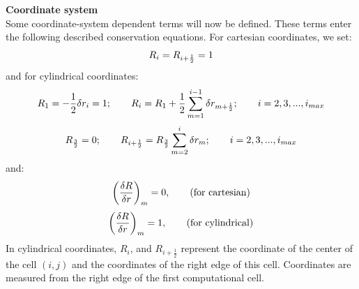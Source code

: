 %
{\bf Coordinate system}\\
Some coordinate-system dependent terms will now be defined.
These terms enter the following described conservation equations.
For cartesian coordinates, we set:
%
\begin{eqnarray}
\htmlimage{}
R_{i} =  R_{i+\frac{1}{2}} = 1
\nonumber
\end{eqnarray}
%
and for cylindrical coordinates:
%
\begin{eqnarray}
\htmlimage{}
R_{1} =  -\frac{1}{2} \delta r_{i} = 1;
\qquad R_{i} =  R_{1}+\frac{1}{2} \sum_{m=1}^{i-1}
\delta r_{m+\frac{1}{2}};\qquad i=2,3,...,i_{max}
\nonumber
\end{eqnarray}
%
\begin{eqnarray}
\htmlimage{}
R_{\frac{3}{2}} =  0; \qquad R_{i+\frac{1}{2}} =  R_{\frac{3}{2}} \sum_{m=2}^{i}
\delta r_{m}; \qquad i = 2,3,...,i_{max}
\nonumber
\end{eqnarray}
%
and:
%
\begin{eqnarray}
\htmlimage{}
\bigg(\frac{\delta R}{\delta r}\bigg)_m  =  0, \qquad \mbox{\rm (for cartesian)}
\nonumber
\end{eqnarray}
%
\begin{eqnarray}
\htmlimage{}
\bigg(\frac{\delta R}{\delta r}\bigg)_m  =  1, \qquad \mbox{\rm (for cylindrical)}
\nonumber
\end{eqnarray}
%
In cylindrical coordinates, $R_{i}$, and $R_{i+\frac{1}{2}}$ represent the coordinate
of the center of the cell $(i,j)$ and the coordinates of the right edge of this cell.
Coordinates are measured from the right edge of the first computational cell.\\

\clearpage
